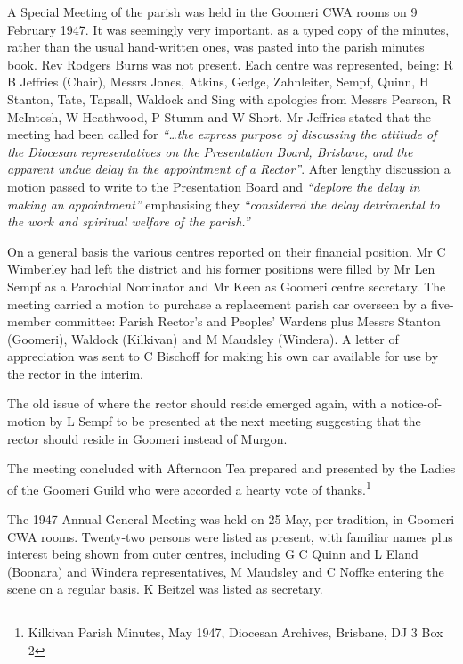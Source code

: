 A Special Meeting of the parish was held in the Goomeri CWA rooms on 9 February 1947. It was seemingly very important, as a typed copy of the minutes, rather than the usual hand-written ones, was pasted into the parish minutes book. Rev Rodgers Burns was not present. Each centre was represented, being: R B Jeffries (Chair), Messrs Jones, Atkins, Gedge, Zahnleiter, Sempf, Quinn, H Stanton, Tate, Tapsall, Waldock and Sing with apologies from Messrs Pearson, R McIntosh, W Heathwood, P Stumm and W Short. Mr Jeffries stated that the meeting had been called for \emph{``\ldots the express purpose of discussing the attitude of the Diocesan representatives on the Presentation Board, Brisbane, and the apparent undue delay in the appointment of a Rector''}. After lengthy discussion a motion passed to write to the Presentation Board and \emph{``deplore the delay in making an appointment''} emphasising they \emph{``considered the delay detrimental to the work and spiritual welfare of the parish.''}



On a general basis the various centres reported on their financial position. Mr C Wimberley had left the district and his former positions were filled by Mr Len Sempf as a Parochial Nominator and Mr Keen as Goomeri centre secretary. The meeting carried a motion to purchase a replacement parish car overseen by a five-member committee: Parish Rector's and Peoples' Wardens plus Messrs Stanton (Goomeri), Waldock (Kilkivan) and M Maudsley (Windera). A letter of appreciation was sent to C Bischoff for making his own car available for use by the rector in the interim.



The old issue of where the rector should reside emerged again, with a notice-of-motion by L Sempf to be presented at the next meeting suggesting that the rector should reside in Goomeri instead of Murgon.



The meeting concluded with Afternoon Tea prepared and presented by the Ladies of the Goomeri Guild who were accorded a hearty vote of thanks.\footnote{Kilkivan Parish Minutes, May 1947, Diocesan Archives, Brisbane, DJ 3 Box 2}


The 1947 Annual General Meeting was held on 25 May, per tradition, in Goomeri CWA rooms. Twenty-two persons were listed as present, with familiar names plus interest being shown from outer centres, including G C Quinn and L Eland (Boonara) and Windera representatives, M Maudsley and C Noffke entering the scene on a regular basis. K Beitzel was listed as secretary.




